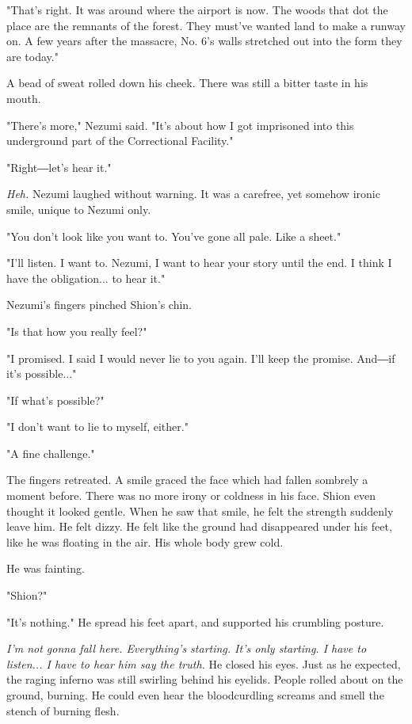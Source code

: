 "That's right. It was around where the airport is now. The woods that
dot the place are the remnants of the forest. They must've wanted land
to make a runway on. A few years after the massacre, No. 6's walls
stretched out into the form they are today."

A bead of sweat rolled down his cheek. There was still a bitter taste in
his mouth.

"There's more," Nezumi said. "It's about how I got imprisoned into this
underground part of the Correctional Facility."

"Right―let's hear it."

\emph{Heh.} Nezumi laughed without warning. It was a carefree, yet somehow
ironic smile, unique to Nezumi only.

"You don't look like you want to. You've gone all pale. Like a sheet."

"I'll listen. I want to. Nezumi, I want to hear your story until the
end. I think I have the obligation... to hear it."

Nezumi's fingers pinched Shion's chin.

"Is that how you really feel?"

"I promised. I said I would never lie to you again. I'll keep the
promise. And―if it's possible..."

"If what's possible?"

"I don't want to lie to myself, either."

"A fine challenge."

The fingers retreated. A smile graced the face which had fallen sombrely
a moment before. There was no more irony or coldness in his face. Shion
even thought it looked gentle. When he saw that smile, he felt the
strength suddenly leave him. He felt dizzy. He felt like the ground had
disappeared under his feet, like he was floating in the air. His whole
body grew cold.

He was fainting.

"Shion?"

"It's nothing." He spread his feet apart, and supported his crumbling
posture.

\emph{I'm not gonna fall here. Everything's starting. It's only starting. I
	have to listen... I have to hear him say the truth.} He closed his eyes.
Just as he expected, the raging inferno was still swirling behind his
eyelids. People rolled about on the ground, burning. He could even hear
the bloodcurdling screams and smell the stench of burning flesh.

